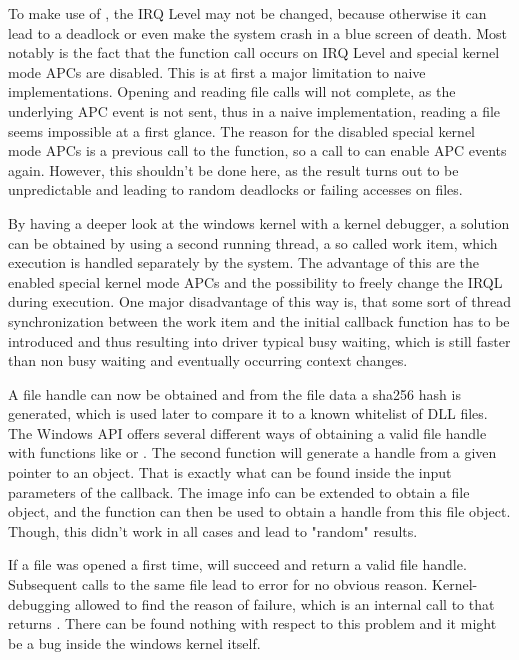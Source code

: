 To make use of , the IRQ Level may not be changed, because otherwise it can lead to a deadlock or even make the system crash in a blue screen of death. Most notably is the fact that the function call occurs on IRQ Level  and special kernel mode APCs are disabled. This is at first a major limitation to naive implementations. Opening and reading file calls will not complete, as the underlying APC event is not sent, thus in a naive implementation, reading a file seems impossible at a first glance. The reason for the disabled special kernel mode APCs is a previous call to the  function, so a call to  can enable APC events again. However, this shouldn't be done here, as the result turns out to be unpredictable and leading to random deadlocks or failing accesses on files.

By having a deeper look at the windows kernel with a kernel debugger, a solution can be obtained by using a second running thread, a so called work item, which execution is handled separately by the system. The advantage of this are the enabled special kernel mode APCs and the possibility to freely change the IRQL during execution. One major disadvantage of this way is, that some sort of thread synchronization between the work item and the initial callback function has to be introduced and thus resulting into driver typical busy waiting, which is still faster than non busy waiting and eventually occurring context changes. 

A file handle can now be obtained and from the file data a sha256 \cite{eckert2014sicherheit} hash is generated, which is used later to compare it to a known whitelist of DLL files. The Windows API offers several different ways of obtaining a valid file handle with functions like  or . The second function  will generate a handle from a given pointer to an object. That is exactly what can be found inside the input parameters of the  callback. The image info can be extended to obtain a file object, and the  function can then be used to obtain a handle from this file object. Though, this didn't work in all cases and lead to "random" results. 

If a file was opened a first time,  will succeed and return a valid file handle. Subsequent calls to the same file lead to error  for no obvious reason. Kernel-debugging allowed to find the reason of failure, which is an internal call to  that returns . There can be found nothing with respect to this problem and it might be a bug inside the windows kernel itself. 

